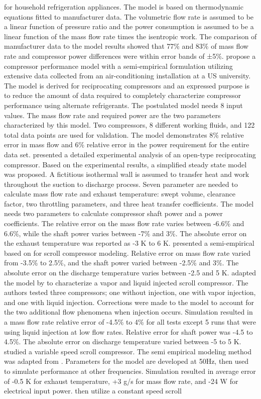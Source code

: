 \documentclass[preprint,11pt,authoryear]{elsarticle}
\begin{document}
for household refrigeration appliances. The model is based on thermodynamic equations fitted to manufacturer data. The volumetric flow rate is assumed to be a linear function of pressure ratio and the power consumption is assumed to be a linear function of the mass flow rate times the isentropic work. The comparison of manufacturer data to the model results showed that 77\% and 83\% of mass flow rate and compressor power differences were within error bands of ±5\%. \cite{Popovic1995a} propose a compressor performance model with a semi-empirical formulation utilizing extensive data collected from an air-conditioning installation at a US university. The model is derived for reciprocating compressors and an expressed purpose is to reduce the amount of data required to completely characterize compressor performance using alternate refrigerants. The postulated model needs 8 input values. The mass flow rate and required power are the two parameters characterized by this model. Two compressors, 8 different working fluids, and 122 total data points are used for validation. The model demonstrates 8\% relative error in mass flow and 6\% relative error in the power requirement for the entire data set. \cite{Winandy_recip} presented a detailed experimental analysis of an open-type reciprocating compressor. Based on the experimental results, a simplified steady state model was proposed. A fictitious isothermal wall is assumed to transfer heat and work throughout the suction to discharge process. Seven parameter are needed to calculate mass flow rate and exhaust temperature: swept volume, clearance factor, two throttling parameters, and three heat transfer coefficients. The model needs two parameters to calculate compressor shaft power and a power coefficients. The relative error on the mass flow rate varies between -6.6\% and 6.6\%, while the shaft power varies between -7\% and 3\%. The absolute error on the exhaust temperature was reported as -3 K to 6 K. \cite{Winandy_scr} presented a semi-empirical based on \cite{Winandy_recip} for scroll compressor modeling. Relative error on mass flow rate varied from -3.5\% to 2.5\%, and the shaft power varied between -2.5\% and 3\%. The absolute error on the discharge temperature varies between -2.5 and 5 K. \cite{Winandy_inj} adapted the model by \cite{Winandy_scr} to characterize a vapor and liquid injected scroll compressor. The authors tested three compressors; one without injection, one with vapor injection, and one with liquid injection. Corrections were made to the model to account for the two additional flow phenomena when injection occurs. Simulation resulted in a mass flow rate relative error of -4.5\% to 4\% for all tests except 5 runs that were using liquid injection at low flow rates. Relative error for shaft power was -4.5 to 4.5\%. The absolute error on discharge temperature varied between -5 to 5 K. \cite{Cuevas2009} studied a variable speed scroll compressor. The semi empirical modeling method was adapted from \cite{Winandy_recip}. Parameters for the model are developed at 50Hz, then used to simulate performance at other frequencies. Simulation resulted in average error of -0.5 K for exhaust temperature, +3 g/s for mass flow rate, and -24 W for electrical input power. \cite{Cuevas2010} then utilize a constant speed scroll 
\end{document}
